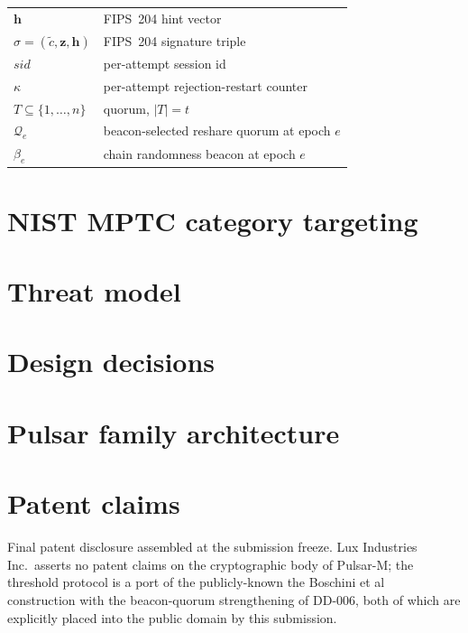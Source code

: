 \documentclass[11pt,a4paper]{article}
\theoremstyle{definition}
\theoremstyle{remark}
\begin{document}
\begin{center}
\begin{tabular}{l l}
$\mathbf{h}$ & FIPS~204 hint vector \\
$\sigma = (\tilde c, \mathbf{z}, \mathbf{h})$ & FIPS~204 signature triple \\
$\mathit{sid}$ & per-attempt session id \\
$\kappa$ & per-attempt rejection-restart counter \\
$T \subseteq \{1, \dots, n\}$ & quorum, $|T| = t$ \\
$\mathcal{Q}_e$ & beacon-selected reshare quorum at epoch $e$ \\
$\beta_e$ & chain randomness beacon at epoch $e$ \\
\bottomrule
\end{tabular}
\end{center}

\section{NIST MPTC category targeting}
\label{sec:nist-mptc-category}


\section{Threat model}
\label{sec:threat-model}


\section{Design decisions}
\label{sec:design-decisions}


\section{Pulsar family architecture}
\label{sec:family-architecture}


\section{Patent claims}
\label{sec:patent}
Final patent disclosure assembled at the submission freeze. Lux
Industries Inc.\ asserts no patent claims on the cryptographic body
of Pulsar-M; the threshold protocol is a port of the publicly-known
the Boschini et al~\cite{boschini2024corona} construction with the beacon-quorum
strengthening of DD-006, both of which are explicitly placed into
the public domain by this submission.

\end{document}
